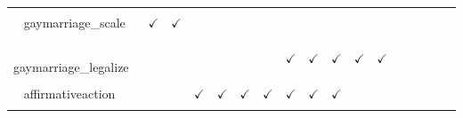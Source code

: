 \documentclass[
  12pt]{article}
\begin{document}
\begin{table}[H]
{\begin{tabular}{lcccccccccccccccc}
\cellcolor{gray!6}{$\textbf{Other}$} & \cellcolor{gray!6}{} & \cellcolor{gray!6}{} & \cellcolor{gray!6}{} & \cellcolor{gray!6}{} & \cellcolor{gray!6}{} & \cellcolor{gray!6}{} & \cellcolor{gray!6}{} & \cellcolor{gray!6}{} & \cellcolor{gray!6}{} & \cellcolor{gray!6}{} & \cellcolor{gray!6}{} & \cellcolor{gray!6}{} & \cellcolor{gray!6}{} & \cellcolor{gray!6}{} & \cellcolor{gray!6}{} & \cellcolor{gray!6}{}\\
$\hspace{10pt}$gaymarriage\_scale & $\checkmark$ & $\checkmark$ &  &  &  &  &  &  &  &  &  &  &  &  &  & \\
\cellcolor{gray!6}{$\hspace{10pt}$gaymarriage\_ban} & \cellcolor{gray!6}{} & \cellcolor{gray!6}{} & \cellcolor{gray!6}{$\checkmark$} & \cellcolor{gray!6}{$\checkmark$} & \cellcolor{gray!6}{$\checkmark$} & \cellcolor{gray!6}{$\checkmark$} & \cellcolor{gray!6}{} & \cellcolor{gray!6}{} & \cellcolor{gray!6}{} & \cellcolor{gray!6}{} & \cellcolor{gray!6}{} & \cellcolor{gray!6}{} & \cellcolor{gray!6}{} & \cellcolor{gray!6}{} & \cellcolor{gray!6}{} & \cellcolor{gray!6}{}\\
$\hspace{10pt}$gaymarriage\_legalize &  &  &  &  &  &  & $\checkmark$ & $\checkmark$ & $\checkmark$ & $\checkmark$ & $\checkmark$ &  &  &  &  & \\
\cellcolor{gray!6}{$\hspace{10pt}$affirmativeaction\_scale} & \cellcolor{gray!6}{$\checkmark$} & \cellcolor{gray!6}{$\checkmark$} & \cellcolor{gray!6}{} & \cellcolor{gray!6}{} & \cellcolor{gray!6}{} & \cellcolor{gray!6}{} & \cellcolor{gray!6}{} & \cellcolor{gray!6}{} & \cellcolor{gray!6}{} & \cellcolor{gray!6}{} & \cellcolor{gray!6}{} & \cellcolor{gray!6}{} & \cellcolor{gray!6}{} & \cellcolor{gray!6}{} & \cellcolor{gray!6}{} & \cellcolor{gray!6}{}\\
$\hspace{10pt}$affirmativeaction &  &  & $\checkmark$ & $\checkmark$ & $\checkmark$ & $\checkmark$ & $\checkmark$ & $\checkmark$ & $\checkmark$ &  &  &  &  &  &  & \\
\cellcolor{gray!6}{$\hspace{10pt}$incometax\_vs\_salestax} & \cellcolor{gray!6}{$\checkmark$} & \cellcolor{gray!6}{$\checkmark$} & \cellcolor{gray!6}{$\checkmark$} & \cellcolor{gray!6}{} & \cellcolor{gray!6}{$\checkmark$} & \cellcolor{gray!6}{$\checkmark$} & \cellcolor{gray!6}{$\checkmark$} & \cellcolor{gray!6}{$\checkmark$} & \cellcolor{gray!6}{$\checkmark$} & \cellcolor{gray!6}{$\checkmark$} & \cellcolor{gray!6}{$\checkmark$} & \cellcolor{gray!6}{$\checkmark$} & \cellcolor{gray!6}{} & \cellcolor{gray!6}{} & \cellcolor{gray!6}{$\checkmark$} & \cellcolor{gray!6}{}\\
\bottomrule
\end{tabular}}
\end{table}
\end{document}

